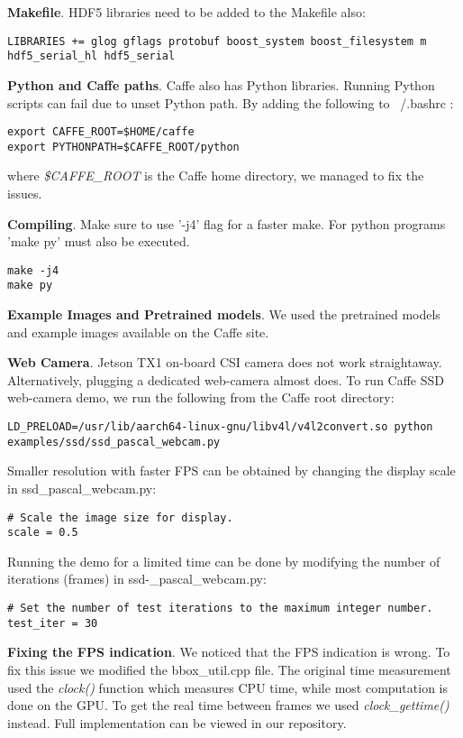 \textbf{Makefile}.
HDF5 libraries need to be added to the Makefile also:
\begin{lstlisting} 
LIBRARIES += glog gflags protobuf boost_system boost_filesystem m hdf5_serial_hl hdf5_serial
\end{lstlisting}

\textbf{Python and Caffe paths}.
Caffe also has Python libraries. Running Python scripts can fail due to unset Python path. By adding the following to ~/.bashrc :
\begin{lstlisting} 
export CAFFE_ROOT=$HOME/caffe
export PYTHONPATH=$CAFFE_ROOT/python
\end{lstlisting}
where \textit{\$CAFFE\_ROOT} is the Caffe home directory, we managed to fix the issues. 

\textbf{Compiling}.
Make sure to use '-j4' flag for a faster make. For python programs 'make py' must also be executed.
\begin{lstlisting} 
make -j4
make py
\end{lstlisting}

\textbf{Example Images and Pretrained models}.
We used the pretrained models and example images available on the Caffe site.

\textbf{Web Camera}.
Jetson TX1 on-board CSI camera does not work straightaway. Alternatively, plugging a dedicated web-camera almost does. To run Caffe SSD web-camera demo, we run the following from the Caffe root directory:
\begin{lstlisting} 
LD_PRELOAD=/usr/lib/aarch64-linux-gnu/libv4l/v4l2convert.so python examples/ssd/ssd_pascal_webcam.py
\end{lstlisting}

Smaller resolution with faster FPS can be obtained by changing the display scale 
in ssd\_pascal\_webcam.py:
\begin{lstlisting} 
# Scale the image size for display.
scale = 0.5
\end{lstlisting}

Running the demo for a limited time can be done by modifying the number of iterations (frames) in ssd-\_pascal\_webcam.py:
\begin{lstlisting} 
# Set the number of test iterations to the maximum integer number.
test_iter = 30 
\end{lstlisting}

\textbf{Fixing the FPS indication}. We noticed that the FPS indication is wrong. To fix this issue we modified the bbox\_util.cpp file. The original time measurement used the \textit{clock()} function which measures CPU time, while most computation is done on the GPU. To get the real time between frames we used \textit{clock\_gettime()} instead. Full implementation can be viewed in our repository.

